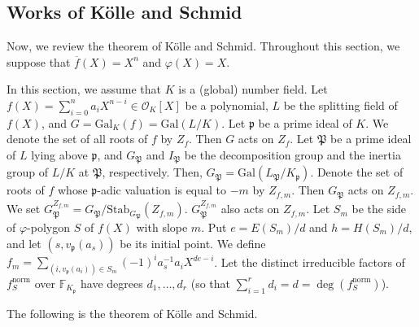 \documentclass[10pt,a4paper]{amsart}
\newcommand{\field}[1]{\mathbb{#1}}
\newcommand{\F}{\field{F}}
\newcommand{\Gal}{\mathrm{Gal}}
\numberwithin{equation}{section}
\begin{document}
  \subsection{Works of Kölle and Schmid}\label{sec:Kölle Schmid}

    Now, we review the theorem of Kölle and Schmid. 
    Throughout this section, we suppose that $\overline{f}(X) = X^n$ and $\varphi(X) = X$. 

    In this section, we assume that $K$ is a (global) number field. 
    Let $f(X)=\sum_{i = 0}^n a_i X^{n - i} \in \mathcal{O}_K[X]$ be a polynomial, $L$ be the splitting field of $f(X)$, and $G = \Gal_K(f) = \Gal(L/K)$. 
    Let $\mathfrak{p}$ be a prime ideal of $K$. 
    We denote the set of all roots of $f$ by $Z_f$. Then $G$ acts on $Z_f$. 
    Let $\mathfrak{P}$ be a prime ideal of $L$ lying above $\mathfrak{p}$, and $G_\mathfrak{P}$ and $I_\mathfrak{P}$ be the 
    decomposition group and the inertia group of $L/K$ at $\mathfrak{P}$, respectively. 
    Then, $G_{\mathfrak{P}} = \Gal(L_{\mathfrak{P}}/K_{\mathfrak{p}})$. 
    Denote the set of roots of $f$ whose $\mathfrak{p}$-adic valuation is equal to $-m$ by $Z_{f,m}$. 
    Then $G_{\mathfrak{P}}$ acts on $Z_{f,m}$. 
    We set $G_{\mathfrak{P}}^{Z_{f,m}} = G_{\mathfrak{P}}/\mathrm{Stab}_{G_{\mathfrak{P}}}(Z_{f,m})$. 
    $G_{\mathfrak{P}}^{Z_{f,m}}$ also acts on $Z_{f,m}$. 
    Let $S_m$ be the side of $\varphi$-polygon $S$ of $f(X)$ with slope $m$. 
    Put $e=E(S_m)/d$ and $h=H(S_m)/d$, and let $(s,v_{\mathfrak{p}}(a_s))$ be its initial point. 
    We define $f_m =  \displaystyle{\sum_{(i,v_{\mathfrak{p}}(a_i)) \in S_m}}  (-1)^i a_s^{-1} a_{i}X^{de-i}$. 
    Let the distinct irreducible factors of $f_S^{\mathrm{norm}}$ over $\F_{K_{\mathfrak{p}}}$ have 
    degrees $d_1, \dots ,d_r$ (so that $\sum_{i = 1}^r d_i = d = \deg (f_S^{\mathrm{norm}})$). 
    
    The following is the theorem of Kölle and Schmid. 
\end{document}
